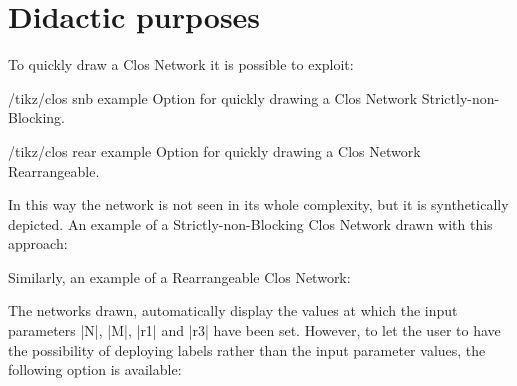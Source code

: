 \documentclass{ltxdoc} %
\begin{document}
\begin{codeexample}[]
\end{codeexample}




\section{Didactic purposes}
To quickly draw a Clos Network  it is possible to exploit:
\begin{key}{/tikz/clos snb example}
    Option for quickly drawing a Clos Network Strictly-non-Blocking.
\end{key}
\begin{key}{/tikz/clos rear example}
    Option for quickly drawing a Clos Network Rearrangeable.
\end{key}
In this way the network is not seen in its whole complexity, but it is synthetically  depicted. An example of a Strictly-non-Blocking Clos Network drawn with this approach:
\begin{codeexample}[]
\end{codeexample}

Similarly, an example of a Rearrangeable Clos Network:
\begin{codeexample}[]
\end{codeexample}

The networks drawn, automatically display the values at which the input parameters |N|, |M|, |r1| and |r3| have been set. However, to let the user to have the possibility of deploying labels rather than the input parameter values, the following option is available:
\end{document}
